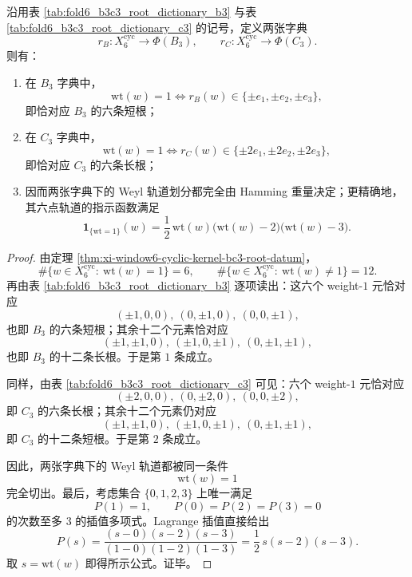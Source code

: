 \begin{theorem}\label{thm:xi-time-part62dea-window6-weight-determines-weyl-orbits}
沿用表 \ref{tab:fold6_b3c3_root_dictionary_b3} 与表 \ref{tab:fold6_b3c3_root_dictionary_c3} 的记号，定义两张字典
\[
r_B:X_6^{\mathrm{cyc}}\to \Phi(B_3),
\qquad
r_C:X_6^{\mathrm{cyc}}\to \Phi(C_3).
\]
则有：
\begin{enumerate}
  \item 在 \(B_3\) 字典中，
  \[
  \mathrm{wt}(w)=1
  \iff
  r_B(w)\in \{\pm e_1,\pm e_2,\pm e_3\},
  \]
  即恰对应 \(B_3\) 的六条短根；
  \item 在 \(C_3\) 字典中，
  \[
  \mathrm{wt}(w)=1
  \iff
  r_C(w)\in \{\pm 2e_1,\pm 2e_2,\pm 2e_3\},
  \]
  即恰对应 \(C_3\) 的六条长根；
  \item 因而两张字典下的 Weyl 轨道划分都完全由 Hamming 重量决定；更精确地，其六点轨道的指示函数满足
  \[
  \mathbf 1_{\{\mathrm{wt}=1\}}(w)
  =
  \frac12\,\mathrm{wt}(w)\bigl(\mathrm{wt}(w)-2\bigr)\bigl(\mathrm{wt}(w)-3\bigr).
  \]
\end{enumerate}
\end{theorem}
\begin{proof}
由定理 \ref{thm:xi-window6-cyclic-kernel-bc3-root-datum}，
\[
\#\{w\in X_6^{\mathrm{cyc}}:\ \mathrm{wt}(w)=1\}=6,
\qquad
\#\{w\in X_6^{\mathrm{cyc}}:\ \mathrm{wt}(w)\neq 1\}=12.
\]
再由表 \ref{tab:fold6_b3c3_root_dictionary_b3} 逐项读出：这六个 weight-\(1\) 元恰对应
\[
(\pm1,0,0),\ (0,\pm1,0),\ (0,0,\pm1),
\]
也即 \(B_3\) 的六条短根；其余十二个元素恰对应
\[
(\pm1,\pm1,0),\ (\pm1,0,\pm1),\ (0,\pm1,\pm1),
\]
也即 \(B_3\) 的十二条长根。于是第 \(1\) 条成立。

同样，由表 \ref{tab:fold6_b3c3_root_dictionary_c3} 可见：六个 weight-\(1\) 元恰对应
\[
(\pm2,0,0),\ (0,\pm2,0),\ (0,0,\pm2),
\]
即 \(C_3\) 的六条长根；其余十二个元素仍对应
\[
(\pm1,\pm1,0),\ (\pm1,0,\pm1),\ (0,\pm1,\pm1),
\]
即 \(C_3\) 的十二条短根。于是第 \(2\) 条成立。

因此，两张字典下的 Weyl 轨道都被同一条件
\[
\mathrm{wt}(w)=1
\]
完全切出。最后，考虑集合 \(\{0,1,2,3\}\) 上唯一满足
\[
P(1)=1,
\qquad
P(0)=P(2)=P(3)=0
\]
的次数至多 \(3\) 的插值多项式。Lagrange 插值直接给出
\[
P(s)=\frac{(s-0)(s-2)(s-3)}{(1-0)(1-2)(1-3)}
=
\frac12\,s(s-2)(s-3).
\]
取 \(s=\mathrm{wt}(w)\) 即得所示公式。证毕。
\end{proof}

